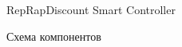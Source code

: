 \documentclass[a4paper,12pt]{article}
\theoremstyle{plain}                          %
\theoremstyle{definition}                     %
\theoremstyle{remark}                         %
\begin{document}
\begin{figure}[H]
    \caption{RepRapDiscount Smart Controller}
\end{figure}


\begin{figure}[H]
    \caption{Схема компонентов}
\end{figure}
\end{document}
